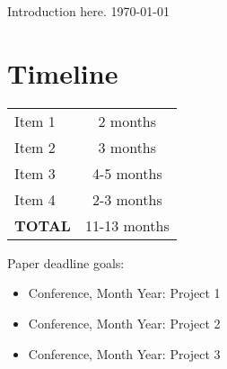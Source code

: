 \documentclass{article}
\begin{document}

Introduction here\cite{landau_fast_1988}.
\today








\section{Timeline}

\begin{center}
\begin{tabular}{|l|c|}
\hline
Item 1 & 2 months \\
Item 2 & 3 months \\
Item 3 & 4-5 months \\
Item 4 & 2-3 months \\
\hline
\textbf{TOTAL} & 11-13 months \\
\hline
\end{tabular}
\end{center}

Paper deadline goals:

\begin{itemize}
\item Conference, Month Year: Project 1
\item Conference, Month Year: Project 2
\item Conference, Month Year: Project 3
\end{itemize}
\end{document}
